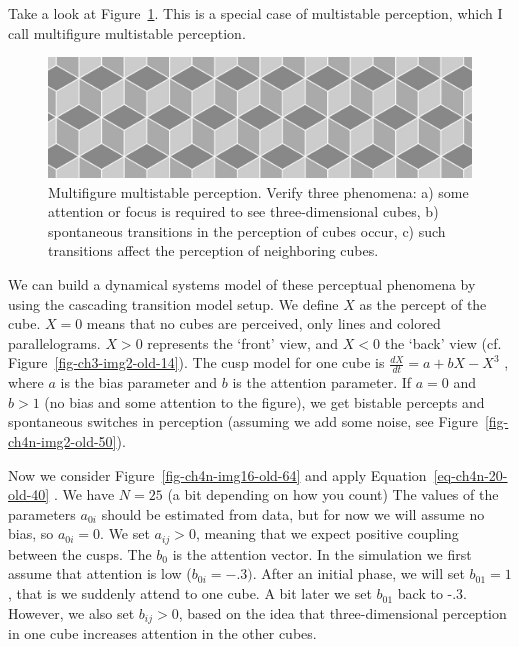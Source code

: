 \documentclass[
  a4paper,
  DIV=11,
  numbers=noendperiod]{scrreprt}
\begin{document}
Take a look at Figure~\ref{fig-ch4n-img18-old-66}. This is a special
case of multistable perception, which I call multifigure multistable
perception.

\begin{figure}

{\centering \includegraphics{media/ch4n/image18.jpg}

}

\caption{\label{fig-ch4n-img18-old-66}Multifigure multistable
perception. Verify three phenomena: a) some attention or focus is
required to see three-dimensional cubes, b) spontaneous transitions in
the perception of cubes occur, c) such transitions affect the perception
of neighboring cubes.}

\end{figure}

We can build a dynamical systems model of these perceptual phenomena by
using the cascading transition model setup. We define \(X\) as the
percept of the cube. \(X = 0\) means that no cubes are perceived, only
lines and colored parallelograms. \(X > 0\) represents the `front' view,
and \(X < 0\) the `back' view (cf. Figure~\ref{fig-ch3-img2-old-14}).
The cusp model for one cube is \(\frac{dX}{dt} = {a + bX - X}^{3}\) ,
where \(a\) is the bias parameter and \(b\) is the attention parameter.
If \(a = 0\) and \(b > 1\) (no bias and some attention to the figure),
we get bistable percepts and spontaneous switches in perception
(assuming we add some noise, see Figure~\ref{fig-ch4n-img2-old-50}).

Now we consider Figure~\ref{fig-ch4n-img16-old-64} and apply
Equation~\ref{eq-ch4n-20-old-40} . We have \(N = 25\) (a bit depending
on how you count) The values of the parameters \(a_{0i}\) should be
estimated from data, but for now we will assume no bias, so
\(a_{0i} = 0\). We set \(a_{ij} > 0\), meaning that we expect positive
coupling between the cusps. The \(b_{0}\) is the attention vector. In
the simulation we first assume that attention is low
(\(b_{0i} = - .3)\). After an initial phase, we will set \(b_{01} = 1\),
that is we suddenly attend to one cube. A bit later we set \(b_{01}\)
back to -.3. However, we also set \(b_{ij} > 0\), based on the idea that
three-dimensional perception in one cube increases attention in the
other cubes.
\end{document}
